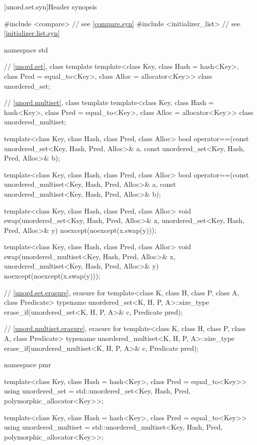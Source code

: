 [unord.set.syn]{Header  synopsis}

%
%
%
\begin{codeblock}
#include <compare>              // see \ref{compare.syn}
#include <initializer_list>     // see \ref{initializer.list.syn}

namespace std {
  // \ref{unord.set}, class template 
  template<class Key,
           class Hash = hash<Key>,
           class Pred = equal_to<Key>,
           class Alloc = allocator<Key>>
    class unordered_set;

  // \ref{unord.multiset}, class template 
  template<class Key,
           class Hash = hash<Key>,
           class Pred = equal_to<Key>,
           class Alloc = allocator<Key>>
    class unordered_multiset;

  template<class Key, class Hash, class Pred, class Alloc>
    bool operator==(const unordered_set<Key, Hash, Pred, Alloc>& a,
                    const unordered_set<Key, Hash, Pred, Alloc>& b);

  template<class Key, class Hash, class Pred, class Alloc>
    bool operator==(const unordered_multiset<Key, Hash, Pred, Alloc>& a,
                    const unordered_multiset<Key, Hash, Pred, Alloc>& b);

  template<class Key, class Hash, class Pred, class Alloc>
    void swap(unordered_set<Key, Hash, Pred, Alloc>& x,
              unordered_set<Key, Hash, Pred, Alloc>& y)
      noexcept(noexcept(x.swap(y)));

  template<class Key, class Hash, class Pred, class Alloc>
    void swap(unordered_multiset<Key, Hash, Pred, Alloc>& x,
              unordered_multiset<Key, Hash, Pred, Alloc>& y)
      noexcept(noexcept(x.swap(y)));

  // \ref{unord.set.erasure}, erasure for 
  template<class K, class H, class P, class A, class Predicate>
    typename unordered_set<K, H, P, A>::size_type
      erase_if(unordered_set<K, H, P, A>& c, Predicate pred);

  // \ref{unord.multiset.erasure}, erasure for 
  template<class K, class H, class P, class A, class Predicate>
    typename unordered_multiset<K, H, P, A>::size_type
      erase_if(unordered_multiset<K, H, P, A>& c, Predicate pred);

  namespace pmr {
    template<class Key,
             class Hash = hash<Key>,
             class Pred = equal_to<Key>>
      using unordered_set = std::unordered_set<Key, Hash, Pred,
                                               polymorphic_allocator<Key>>;

    template<class Key,
             class Hash = hash<Key>,
             class Pred = equal_to<Key>>
      using unordered_multiset = std::unordered_multiset<Key, Hash, Pred,
                                                         polymorphic_allocator<Key>>;
  }
}
\end{codeblock}

